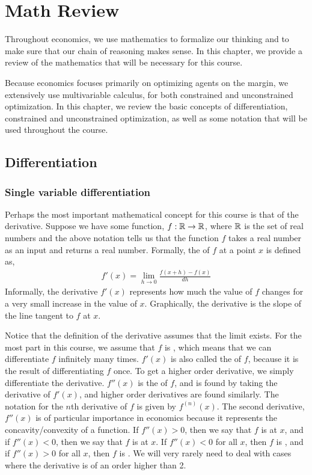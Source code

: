 \chapter{Math Review}
Throughout economics, we use mathematics to formalize our thinking and to make sure that our chain of reasoning makes sense. In this chapter, we provide a review of the mathematics that will be necessary for this course.

Because economics focuses primarily on optimizing agents on the margin, we extensively use multivariable calculus, for both constrained and unconstrained optimization. In this chapter, we review the basic concepts of differentiation, constrained and unconstrained optimization, as well as some notation that will be used throughout the course. 

\section{Differentiation}
\subsection*{Single variable differentiation}
Perhaps the most important mathematical concept for this course is that of the derivative. Suppose we have some function, $f: \mathbb{R} \to \mathbb{R}$, where $\mathbb{R}$ is the set of real numbers and the above notation tells us that the function $f$ takes a real number as an input and returns a real number. Formally, the  of $f$ at a point $x$ is defined as,
\begin{align*}
    f'(x) = \lim_{h \to 0} \frac{f(x + h) - f(x)}{dh}
\end{align*}
Informally, the derivative $f'(x)$ represents how much the value of $f$ changes for a very small increase in the value of $x$. Graphically, the derivative is the slope of the line tangent to $f$ at $x$. 

Notice that the definition of the derivative assumes that the limit exists. For the most part in this course, we assume that $f$ is , which means that we can differentiate $f$ infinitely many times. $f'(x)$ is also called the  of $f$, because it is the result of differentiating $f$ once. To get a higher order derivative, we simply differentiate the derivative. $f''(x)$ is the  of $f$, and is found by taking the derivative of $f'(x)$, and higher order derivatives are found similarly. The notation for the $n$th derivative of $f$ is given by $f^{(n)}(x)$. The second derivative, $f''(x)$ is of particular importance in economics because it represents the concavity/convexity of a function. If $f''(x) > 0$, then we say that $f$ is  at $x$, and if $f''(x) < 0$, then we say that $f$ is  at $x$. If $f''(x) < 0$ for all $x$, then $f$ is , and if $f''(x) > 0$ for all $x$, then $f$ is . We will very rarely need to deal with cases where the derivative is of an order higher than 2.

